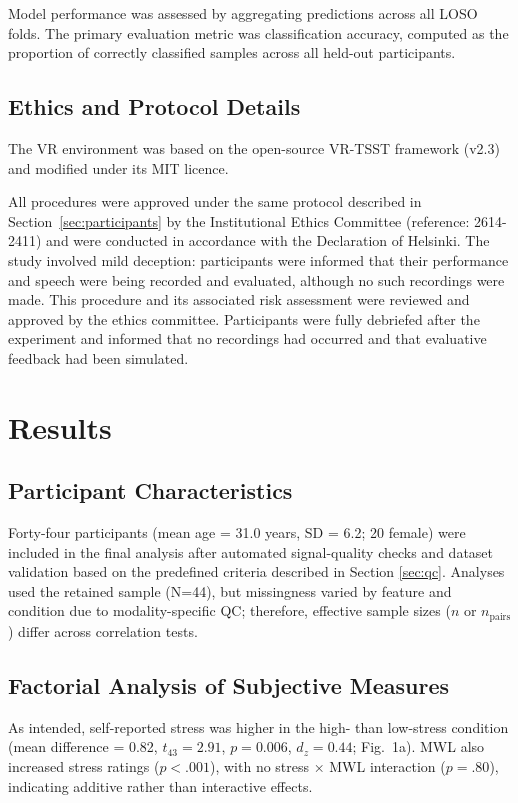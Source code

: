 \documentclass[lettersize,journal]{IEEEtran}
\begin{document}
Model performance was assessed by aggregating predictions across all LOSO folds. The primary evaluation metric was classification accuracy, computed as the proportion of correctly classified samples across all held-out participants.

\subsection{Ethics and Protocol Details}
The VR environment was based on the open-source VR-TSST framework (v2.3) and modified under its MIT licence.

All procedures were approved under the same protocol described in Section~\ref{sec:participants} by the Institutional Ethics Committee (reference: 2614-2411) and were conducted in accordance with the Declaration of Helsinki. 
The study involved mild deception: participants were informed that their performance and speech were being recorded and evaluated, although no such recordings were made. 
This procedure and its associated risk assessment were reviewed and approved by the ethics committee. 
Participants were fully debriefed after the experiment and informed that no recordings had occurred and that evaluative feedback had been simulated.

\section{Results}

\subsection {Participant Characteristics}

Forty-four participants (mean age = 31.0 years, SD = 6.2; 20 female) were included in the final analysis after automated signal-quality checks and dataset validation based on the predefined criteria described in Section \ref{sec:qc}. Analyses used the retained sample (N=44), but missingness varied by feature and condition due to modality-specific QC; therefore, effective sample sizes ($n$ or $n_{\mathrm{pairs}}$) differ across correlation tests.

\subsection{Factorial Analysis of Subjective Measures}

As intended, self-reported stress was higher in the high- than low-stress condition (mean difference = 0.82, $t_{43}=2.91$, $p = 0.006$, $d_z = 0.44$; Fig.~1a). MWL also increased stress ratings ($p < .001$), with no stress × MWL interaction ($p = .80$), indicating additive rather than interactive effects. 
\end{document}
